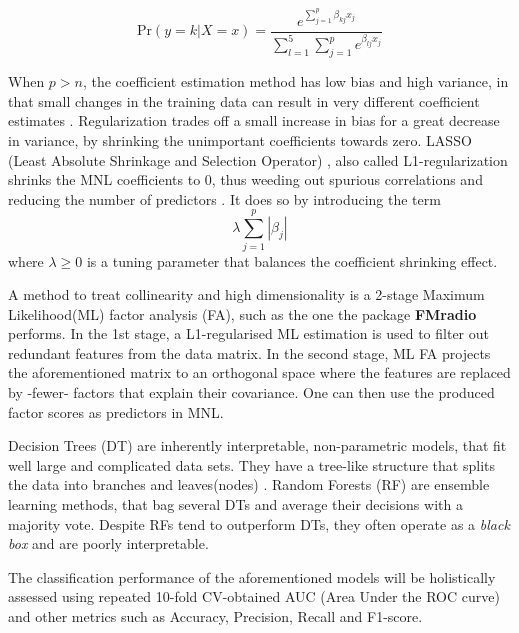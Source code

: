 \documentclass{amsart}
\theoremstyle{plain}
\begin{document}
\[\textrm{Pr}(y=k|X=x) =  \dfrac{e^{\sum_{j=1}^{p}\beta_{kj}x_j}}{\sum_{l=1}^{5}\sum_{j=1}^{p}e^{\beta_{lj}x_j}}\]

When $p > n$, the coefficient estimation method has low bias and high variance, in that small changes in the training data can result in very different coefficient estimates \cite{James2023AnEdition}. Regularization trades off a small increase in bias for a great decrease in variance, by shrinking the unimportant coefficients towards zero. LASSO (Least Absolute Shrinkage and Selection Operator) \cite{Tibshiranit1996RegressionLasso}, also called L1-regularization shrinks the MNL coefficients to 0, thus weeding out spurious correlations and reducing the number of predictors \cite{Tibshiranit1996RegressionLasso}. It does so by introducing the term  \[\lambda\sum_{j=1}^{p}|\beta_j|\] where $\lambda \geq 0$ is a tuning parameter that balances the coefficient shrinking effect.

A method to treat collinearity and high dimensionality is a 2-stage Maximum Likelihood(ML) factor analysis (FA), such as the one the package \textbf{FMradio} \cite{Peeters2019StableData} performs. In the 1st stage, a L1-regularised ML estimation is used to filter out redundant features from the data matrix. In the second stage, ML FA projects the aforementioned matrix to an orthogonal space where the features are replaced by -fewer- factors that explain their covariance. One can then use the produced factor scores as predictors in MNL.

Decision Trees (DT) are inherently interpretable, non-parametric models, that fit well large and complicated data sets. They have a tree-like structure that splits the data into branches and leaves(nodes) \cite{Song2015DecisionPrediction}. Random Forests (RF) are ensemble learning methods, that bag several DTs and average their decisions with a majority vote. Despite RFs tend to outperform DTs, they often operate as a \textit{black box} and are poorly interpretable.

The classification performance of the aforementioned models will be holistically assessed using repeated 10-fold CV-obtained AUC (Area Under the ROC curve) and other metrics such as Accuracy, Precision, Recall and F1-score.
\end{document}
